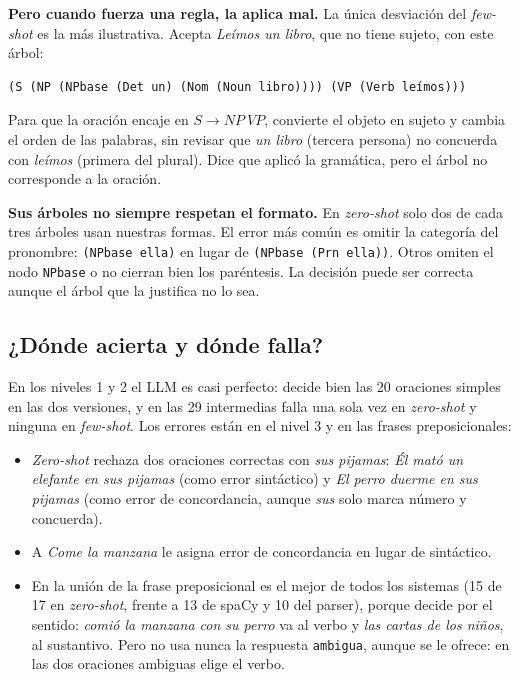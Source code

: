 \textbf{Pero cuando fuerza una regla, la aplica mal.} La única desviación del \emph{few-shot} es
la más ilustrativa. Acepta \emph{Leímos un libro}, que no tiene sujeto, con este árbol:
\begin{lstlisting}
(S (NP (NPbase (Det un) (Nom (Noun libro)))) (VP (Verb leímos)))
\end{lstlisting}
Para que la oración encaje en $S \to NP\ VP$, convierte el objeto en sujeto y cambia el orden
de las palabras, sin revisar que \emph{un libro} (tercera persona) no concuerda con
\emph{leímos} (primera del plural). Dice que aplicó la gramática, pero el árbol no corresponde a
la oración.

\textbf{Sus árboles no siempre respetan el formato.} En \emph{zero-shot} solo dos de cada tres
árboles usan nuestras formas. El error más común es omitir la categoría del pronombre:
\texttt{(NPbase ella)} en lugar de \texttt{(NPbase (Prn ella))}. Otros omiten el nodo
\texttt{NPbase} o no cierran bien los paréntesis. La decisión puede ser correcta aunque el árbol
que la justifica no lo sea.

\subsection{¿Dónde acierta y dónde falla?}

En los niveles 1 y 2 el LLM es casi perfecto: decide bien las 20 oraciones simples en las dos
versiones, y en las 29 intermedias falla una sola vez en \emph{zero-shot} y ninguna en
\emph{few-shot}. Los errores están en el nivel 3 y en las frases
preposicionales:
\begin{itemize}
  \item \emph{Zero-shot} rechaza dos oraciones correctas con \emph{sus pijamas}: \emph{Él mató un
    elefante en sus pijamas} (como error sintáctico) y \emph{El perro duerme en sus pijamas}
    (como error de concordancia, aunque \emph{sus} solo marca número y concuerda).
  \item A \emph{Come la manzana} le asigna error de concordancia en lugar de sintáctico.
  \item En la unión de la frase preposicional es el mejor de todos los sistemas (15 de 17 en
    \emph{zero-shot}, frente a 13 de spaCy y 10 del parser), porque decide por el sentido:
    \emph{comió la manzana con su perro} va al verbo y \emph{las cartas de los niños}, al
    sustantivo. Pero no usa nunca la respuesta \texttt{ambigua}, aunque se le ofrece: en las dos
    oraciones ambiguas elige el verbo.
\end{itemize}

